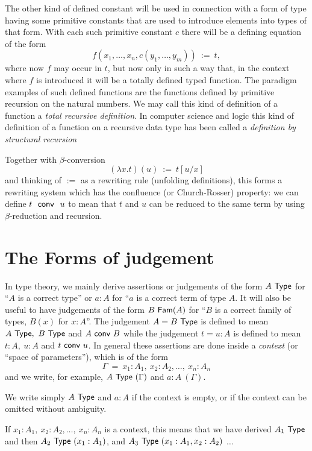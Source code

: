 The other kind of defined constant will be used in connection with a form of type having some primitive constants that are used to introduce elements into types of that form.  With each such primitive constant $c$ there will be a defining equation of the form
$$
f(x_1,\dots,x_n,c(y_1,\dots,y_m)) ~:=~ t,
$$
where now $f$ may occur in $t$, but now only in such a way that, in the context where $f$ is introduced it will be a totally defined typed function.
The paradigm examples of such defined functions are the functions defined by primitive recursion on the natural numbers.  We may call this kind of definition of a function a {\em total recursive definition}.  In computer science and logic this kind of definition of a function on a recursive data type has been called a {\em definition by structural recursion}

Together with $\beta$-conversion
$$
(\lambda x.t)(u) ~:=~ t[u/x]
$$
and thinking of $:=$ as a rewriting rule (unfolding definitions),
this forms a rewriting system which has the confluence (or Church-Rosser) property: we can
define $t~~{\sf conv}~~u$ to mean that $t$ and $u$ can be reduced to the same term by using
$\beta$-reduction and recursion.

\section*{The Forms of judgement}

 In type theory, we mainly derive assertions or judgements of the form $A~{\sf Type}$ for ``$A$ is a correct type'' or $a:A$ for ``$a$ is a correct term of type $A$.  It will also be useful to have judgements of the form $B~{\sf Fam}(A)$
for ``$B$ is a correct family of types, $B(x)$ for $x:A$''.
The judgement $A=B~{\sf Type}$ is defined to mean $A~{\sf Type},~B~{\sf Type}$ and $A~{\sf conv}~ B$
while the judgement $t=u:A$ is defined to mean $t:A,~u:A$ and $t~{\sf conv}~ u$.
In general
these assertions are done inside a {\em context} (or ``space of parameters''), which is of
the form
$$
\Gamma ~=~  x_1:A_1,~x_2:A_2,\dots,~x_n:A_n
$$
and we write, for example, $A~{\sf Type}~(\Gamma)$ and $a:A~(\Gamma)$. 

 We write simply $A~{\sf Type}$ and $a:A$ if the context is empty, or if the context
can be omitted without ambiguity.

 If $x_1:A_1,~x_2:A_2,\dots,~x_n:A_n$ is a context, this means that we have
derived $A_1~{\sf Type}$ and then $A_2~{\sf Type}~(x_1:A_1)$, and $A_3~{\sf Type}~(x_1:A_1,x_2:A_2)$
$\dots$

\medskip

